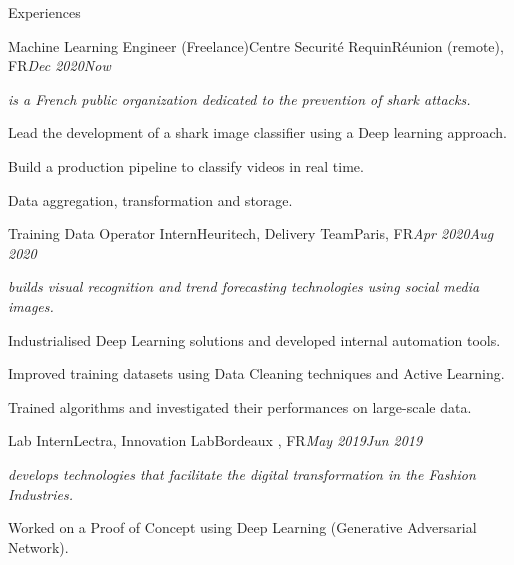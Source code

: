 \documentclass{resume}
\begin{document}
	\begin{rSection}{Experiences}

		\begin{job}{Machine Learning Engineer (Freelance)}{Centre Securité Requin}{Réunion (remote), FR}{\em Dec 2020}{\em Now}{
			\textit{\small{ is a French public organization dedicated to the prevention of shark attacks.}}
			\begin{itemize}
			\small{
				\item Lead the development of a shark image classifier using a Deep learning approach.
				\item Build a production pipeline to classify videos in real time.
				\item Data aggregation, transformation and storage.
				}
			\end{itemize}
		}
		\end{job}

		\begin{job}{Training Data Operator Intern}{Heuritech, Delivery Team}{Paris, FR}{\em Apr 2020}{\em Aug 2020}{
			\textit{\small{builds visual recognition and trend forecasting technologies using social media images.}}
			\begin{itemize}
			\small{
  				\item Industrialised Deep Learning solutions and developed internal automation tools.
				\item Improved training datasets using Data Cleaning techniques and Active Learning.
				\item Trained algorithms and investigated their performances on large-scale data.
				}
			\end{itemize}
		}
		\end{job}
		\begin{job}{Lab Intern}{Lectra, Innovation Lab}{Bordeaux , FR}{\em May 2019}{\em Jun 2019}{
			\textit{\small{develops technologies that facilitate the digital transformation in the Fashion Industries.}}
			\begin{itemize}
			\small{
				  	\item Worked on a Proof of Concept using Deep Learning (Generative Adversarial Network).
				}
			\end{itemize}
		}
		\end{job}
	\end{rSection}
\end{document}
